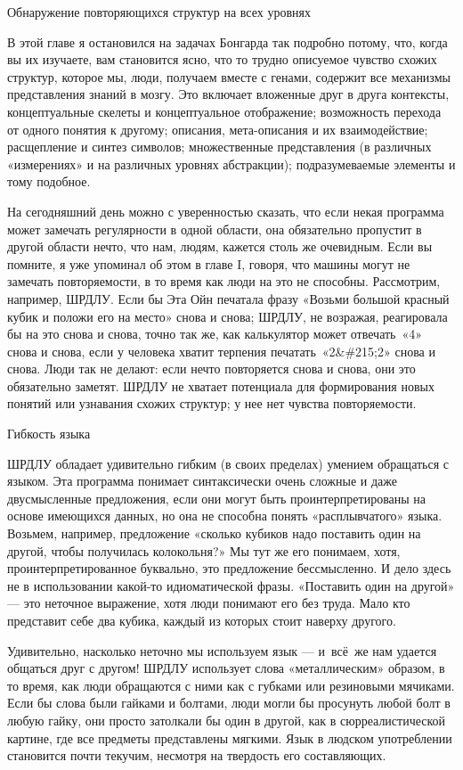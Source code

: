 \documentclass[../main.tex]{subfiles}
\begin{document}
Обнаружение повторяющихся структур на всех уровнях

В этой главе я остановился на задачах Бонгарда так подробно потому, что, когда вы их изучаете, вам становится ясно, что то трудно описуемое чувство схожих структур, которое мы, люди, получаем вместе с генами, содержит все механизмы представления знаний в мозгу. Это включает вложенные друг в друга контексты, концептуальные скелеты и концептуальное отображение; возможность перехода от одного понятия к другому; описания, мета-описания и их взаимодействие; расщепление и синтез символов; множественные представления (в различных «измерениях» и на различных уровнях абстракции); подразумеваемые элементы и тому подобное.

На сегодняшний день можно с уверенностью сказать, что если некая программа может замечать регулярности в одной области, она обязательно пропустит в другой области нечто, что нам, людям, кажется столь же очевидным. Если вы помните, я уже упоминал об этом в главе I, говоря, что машины могут не замечать повторяемости, в то время как люди на это не способны. Рассмотрим, например, ШРДЛУ. Если бы Эта Ойн печатала фразу «Возьми большой красный кубик и положи его на место» снова и снова; ШРДЛУ, не возражая, реагировала бы на это снова и снова, точно так же, как калькулятор может отвечать~«4» снова и снова, если у человека хватит терпения печатать~«2\&\#215;2» снова и снова. Люди так не делают: если нечто повторяется снова и снова, они это обязательно заметят. ШРДЛУ не хватает потенциала для формирования новых понятий или узнавания схожих структур; у нее нет чувства повторяемости.

Гибкость языка

ШРДЛУ обладает удивительно гибким (в своих пределах) умением обращаться с языком. Эта программа понимает синтаксически очень сложные и даже двусмысленные предложения, если они могут быть проинтерпретированы на основе имеющихся данных, но она не способна понять «расплывчатого» языка. Возьмем, например, предложение «сколько кубиков надо поставить один на другой, чтобы получилась колокольня?» Мы тут же его понимаем, хотя, проинтерпретированное буквально, это предложение бессмысленно. И дело здесь не в использовании какой-то идиоматической фразы. «Поставить один на другой» --- это неточное выражение, хотя люди понимают его без труда. Мало кто представит себе два кубика, каждый из которых стоит наверху другого.

Удивительно, насколько неточно мы используем язык --- и~всё~же нам удается общаться друг с другом! ШРДЛУ использует слова «металлическим» образом, в то время, как люди обращаются с ними как с губками или резиновыми мячиками. Если бы слова были гайками и болтами, люди могли бы просунуть любой болт в любую гайку, они просто затолкали бы один в другой, как в сюрреалистической картине, где все предметы представлены мягкими. Язык в людском употреблении становится почти текучим, несмотря на твердость его составляющих.
\end{document}
